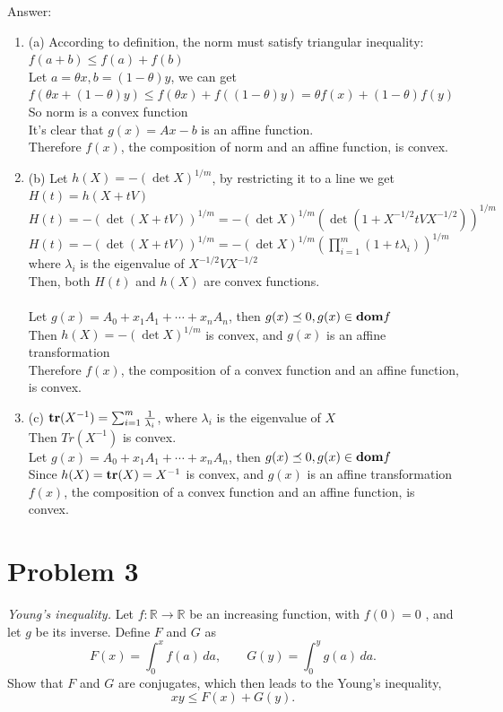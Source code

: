 \documentclass{article}
\newcommand{\reals}{{\mathbb{R}}}
\newcommand{\dom}{{\bf{dom}}}
\newcommand{\Tr}{{\bf{tr}}}
\theoremstyle{definition}
\theoremstyle{definition}
\theoremstyle{remark}
\begin{document}
{\bf{Answer:
\begin{enumerate}
    \item (a) According to definition, the norm must satisfy triangular inequality:
    \\$f(a+b)\leq f(a)+f(b)$
    \\Let $a=\theta x, b=(1-\theta)y$, we can get $f(\theta x+(1-\theta)y)\leq f(\theta x)+f((1-\theta)y)=\theta f(x)+(1-\theta)f(y)$
    \\So norm is a convex function
    \\It's clear that $g(x)=Ax-b$ is an affine function.
    \\Therefore $f(x)$, the composition of norm and an affine function, is convex.
    \item (b) Let $h(X)=-(\det X)^{1/m}$, by restricting it to a line we get $H(t)=h(X+tV)$
    \\$H(t)=-(\det(X+tV))^{1/m}=-(\det X)^{1/m}(\det(1+X^{-1/2}tVX^{-1/2}))^{1/m}$
    \\$H(t)=-(\det(X+tV))^{1/m}=-(\det X)^{1/m}(\prod_{i=1}^m(1+t\lambda_i))^{1/m}$ where $\lambda_i$ is the eigenvalue of $X^{-1/2}VX^{-1/2}$
    \\Then, both $H(t)$ and $h(X)$ are convex functions.
    \\\\Let $g(x)=A_0+x_1A_1+\cdots+x_nA_n$, then $g(x)\preceq 0, g(x)\in \dom f$
    \\Then $h(X)=-(\det X)^{1/m}$ is convex, and $g(x)$ is an affine transformation
    \\Therefore $f(x)$, the composition of a convex function and an affine function, is convex.
    \item (c) $\Tr(X^{-1})=\sum_{i=1}^m\frac{1}{\lambda_i}$, where $\lambda_i$ is the eigenvalue of $X$ 
    \\Then $Tr(X^{-1})$ is convex.
    \\Let $g(x)=A_0+x_1A_1+\cdots+x_nA_n$, then $g(x)\preceq 0, g(x)\in \dom f$
    \\Since $h(X)=\Tr (X)=X^{-1}$ is convex, and $g(x)$ is an affine transformation
    \\$f(x)$, the composition of a convex function and an affine function, is convex.
\end{enumerate}    
}}

\section*{Problem 3}\label{exe-sep-hyp-strict-counterexample}
\emph{Young's inequality. } Let  $ f:\reals\rightarrow \reals $  be an increasing function, with
$ f(0)=0 $ , and let  $ g $  be its inverse. Define  $ F $  and  $ G $  as
\[
F(x) = \int_0^x f(a) \,da, \qquad  G(y) = \int_0^y g(a) \,da.
\]
Show that  $ F $  and  $ G $  are conjugates, which then leads to the Young's inequality,
\[
xy \leqslant F(x) + G(y).
\]
\end{document}
